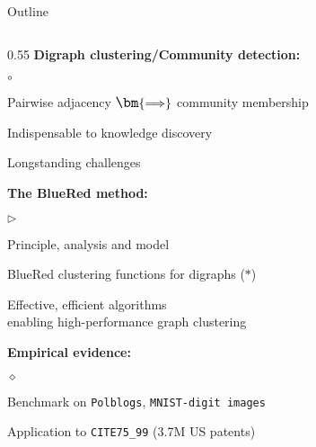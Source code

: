 %
% 

\begin{frame}{Outline}
  \begin{columns}[T]
    \begin{column}{0.55\textwidth}
      {\bf \large Digraph clustering/Community detection: }
      \begin{list}{$\circ$}{\leftmargin=15pt}
        \small
        \item Pairwise adjacency $\large \bm{ \Longrightarrow } $
                  community membership
        \item  Indispensable to knowledge discovery
        \item  Longstanding challenges
      \end{list}

      \vspace*{0.5em}                           %

      {\bf \large The BlueRed method:}
      \begin{list}{$\triangleright$}{\leftmargin=15pt}
        \small
        \item Principle, analysis and model
        \item BlueRed clustering functions for digraphs ($\ast$)
        \item Effective, efficient algorithms
        \\ enabling high-performance graph clustering
      \end{list}

      \vspace*{0.5em}

      {\bf \large Empirical evidence:}
      \begin{list}{$\diamond$}{\leftmargin=15pt}
        \small
        \item Benchmark on {\tt Polblogs}, {\tt MNIST-digit images}
        \item Application to {\tt CITE75\_99}
        {\footnotesize (3.7M US patents) }
      \end{list}
    \end{column}%


\end{columns}
\end{frame}
